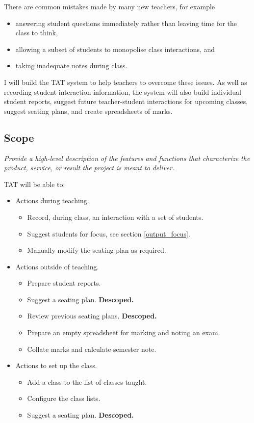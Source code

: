 \documentclass[10pt]{article}
\begin{document}
There are common mistakes made by many new teachers, for example 
\begin{itemize}
\item answering student questions immediately rather than leaving time for the class to think,
\item allowing a subset of students to monopolise class interactions, and
\item taking inadequate notes during class.
\end{itemize}
I will build the TAT system to help teachers to overcome these issues. As well as recording student interaction information, the system will also build individual student reports, suggest future teacher-student interactions for upcoming classes, suggest seating plans, and create spreadsheets of marks.

\subsection{Scope} 
\emph{Provide a high-level description of the features and functions that characterize the product, service, or result the project is meant to deliver.}

TAT will be able to:
\begin{itemize}
\item Actions during teaching.
\begin{itemize}
  \item Record, during class, an interaction with a set of students.
  \item Suggest students for focus, see section \ref{output_focus}.
  \item Manually modify the seating plan as required.
 \end{itemize}
 \item Actions outside of teaching.
 \begin{itemize}
  \item Prepare student reports.
  \item Suggest a seating plan. \textbf{Descoped.}
  \item Review previous seating plans.  \textbf{Descoped.}
  \item Prepare an empty spreadsheet for marking and noting an exam.
  \item Collate marks and calculate semester note.
\end{itemize}
\item Actions to set up the class.
\begin{itemize}
  \item Add a class to the list of classes taught.
  \item Configure the class lists.
  \item Suggest a seating plan.  \textbf{Descoped.}
\end{itemize}
\end{itemize}
\end{document}
